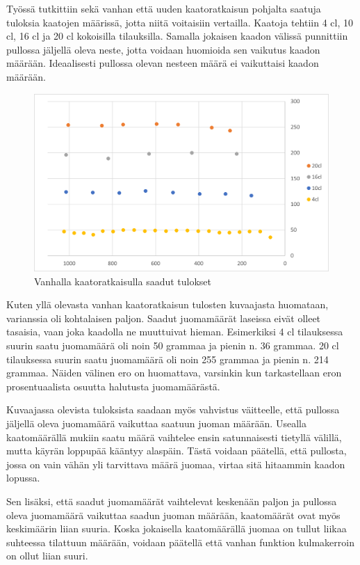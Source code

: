 Työssä tutkittiin sekä vanhan että uuden kaatoratkaisun pohjalta saatuja tuloksia kaatojen määrissä, jotta niitä voitaisiin vertailla. Kaatoja tehtiin 4 cl, 10 cl, 16 cl ja 20 cl kokoisilla tilauksilla. Samalla jokaisen kaadon välissä punnittiin pullossa jäljellä oleva neste, jotta voidaan huomioida sen vaikutus kaadon määrään. Ideaalisesti pullossa olevan nesteen määrä ei vaikuttaisi kaadon määrään.

\begin{figure}[h]
\begin{center}
\includegraphics[scale=0.75]{img/kaadot_vanha.png}
\end{center}
\caption{Vanhalla kaatoratkaisulla saadut tulokset}
\label{fig:kaadot_vanha}
\end{figure}

Kuten yllä olevasta vanhan kaatoratkaisun tulosten kuvaajasta huomataan, varianssia oli kohtalaisen paljon. Saadut juomamäärät laseissa eivät olleet tasaisia, vaan joka kaadolla ne muuttuivat hieman. Esimerkiksi 4 cl tilauksessa suurin saatu juomamäärä oli noin 50 grammaa ja pienin n. 36 grammaa. 20 cl tilauksessa suurin saatu juomamäärä oli noin 255 grammaa ja pienin n. 214 grammaa. Näiden välinen ero on huomattava, varsinkin kun tarkastellaan eron prosentuaalista osuutta halutusta juomamäärästä.

Kuvaajassa olevista tuloksista saadaan myös vahvistus väitteelle, että pullossa jäljellä oleva juomamäärä vaikuttaa saatuun juoman määrään. Usealla kaatomäärällä mukiin saatu määrä vaihtelee ensin satunnaisesti tietyllä välillä, mutta käyrän loppupää kääntyy alaspäin. Tästä voidaan päätellä, että pullosta, jossa on vain vähän yli tarvittava määrä juomaa, virtaa sitä hitaammin kaadon lopussa.

Sen lisäksi, että saadut juomamäärät vaihtelevat keskenään paljon ja pullossa oleva juomamäärä vaikuttaa saadun juoman määrään, kaatomäärät ovat myös keskimäärin liian suuria. Koska jokaisella kaatomäärällä juomaa on tullut liikaa suhteessa tilattuun määrään, voidaan päätellä että vanhan funktion kulmakerroin on ollut liian suuri.

